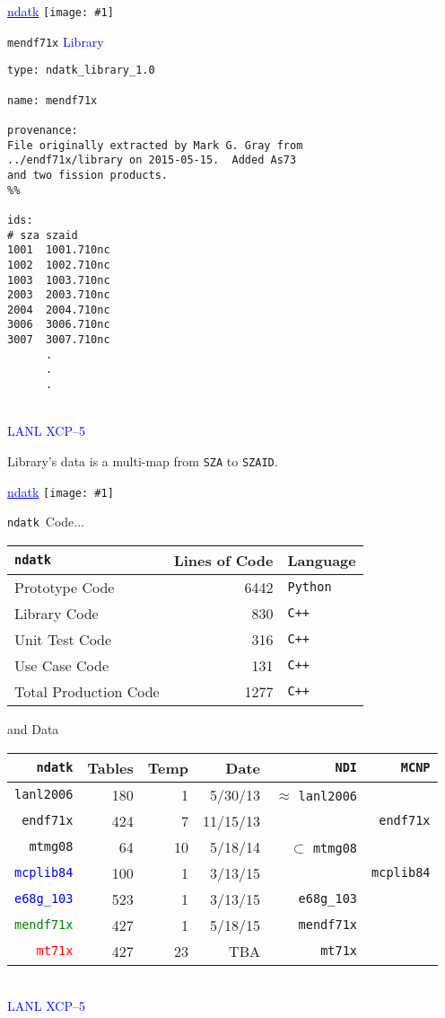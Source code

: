 \documentclass[clock]{slides}
\newenvironment{xslide}[1][logo.jpg]{\begin{slide} \tiny
\textcolor{blue}{\underline{ndatk}} \hfill
\texttt{[image: \#1]}
\normalsize}{\vfill\tiny
\textcolor{blue}{\hrulefill \\LANL XCP--5}
\end{slide}}
\newcommand{\ndatk}{\texttt{ndatk}}
\newcommand{\zaid}{\texttt{SZAID}}
\begin{document}
\begin{xslide}
\begin{center}\Large
\texttt{mendf71x} \textcolor{blue}{Library}
\end{center}
\small
\begin{verbatim}
type: ndatk_library_1.0

name: mendf71x

provenance:
File originally extracted by Mark G. Gray from 
../endf71x/library on 2015-05-15.  Added As73 
and two fission products.
%%

ids:
# sza szaid
1001  1001.710nc
1002  1002.710nc
1003  1003.710nc
2003  2003.710nc
2004  2004.710nc
3006  3006.710nc
3007  3007.710nc
      .
      .
      .
\end{verbatim}
\end{xslide}

\begin{note}\small
Library's data is a multi-map from \texttt{SZA} to \zaid.
\end{note}

\begin{xslide}
\begin{center}\Large
\ndatk\ Code...
\end{center}\small
\begin{tabular}{lr|l}\hline
\texttt{ndatk} & Lines of Code & Language \\ \hline
Prototype Code & 6442 & \texttt{Python} \\ \hline
Library Code & 830 & \texttt{C++} \\
Unit Test Code & 316 & \texttt{C++} \\
Use Case Code & 131 & \texttt{C++} \\ \hline
Total Production Code & 1277 & \texttt{C++}
\end{tabular}

\medskip
\begin{center}\Large
and Data
\end{center}\tiny
\begin{tabular}{rrrr|rr}\hline
\texttt{ndatk} & Tables & Temp & Date & \texttt{NDI} & \texttt{MCNP} \\ \hline
\texttt{lanl2006} & 180 & 1 & 5/30/13 & $\approx$ \texttt{lanl2006} & \\
\texttt{endf71x} & 424 & 7 & 11/15/13 & & \texttt{endf71x} \\
\texttt{mtmg08} & 64 & 10 & 5/18/14 & $\subset$ \texttt{mtmg08} \\ \hline
\textcolor{blue}{\texttt{mcplib84}} & 100 & 1 & 3/13/15 &  & \texttt{mcplib84}\\
\textcolor{blue}{\texttt{e68g\_103}} & 523 & 1 & 3/13/15 & \texttt{e68g\_103} &\\ \hline
\textcolor{green}{\texttt{mendf71x}} & 427 & 1 & 5/18/15 &
\texttt{mendf71x} & \\ \hline
\textcolor{red}{\texttt{mt71x}} & 427 & 23 & TBA & \texttt{mt71x} & 
\end{tabular}

\end{xslide}
\end{document}
